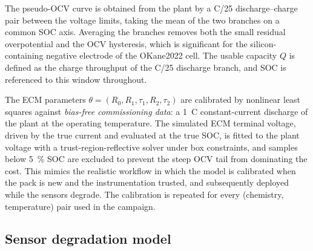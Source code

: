 \documentclass[11pt,a4paper]{article}
\begin{document}
The pseudo-OCV curve is obtained from the plant by a C/25
discharge--charge pair between the voltage limits, taking the mean of the
two branches on a common SOC axis. Averaging the branches removes both the
small residual overpotential and the OCV hysteresis, which is significant
for the silicon-containing negative electrode of the OKane2022 cell. The
usable capacity $Q$ is defined as the charge throughput of the C/25
discharge branch, and SOC is referenced to this window throughout.

The ECM parameters $\theta = (R_0, R_1, \tau_1, R_2, \tau_2)$ are
calibrated by nonlinear least squares against \emph{bias-free
commissioning data}: a \SI{1}{C} constant-current discharge of the plant at
the operating temperature. The simulated ECM terminal voltage, driven by
the true current and evaluated at the true SOC, is fitted to the plant
voltage with a trust-region-reflective solver under box constraints, and
samples below \SI{5}{\percent} SOC are excluded to prevent the steep OCV
tail from dominating the cost. This mimics the realistic workflow in which
the model is calibrated when the pack is new and the instrumentation
trusted, and subsequently deployed while the sensors degrade. The
calibration is repeated for every (chemistry, temperature) pair used in the
campaign.

\subsection{Sensor degradation model}
\label{sec:sensors}
\end{document}
